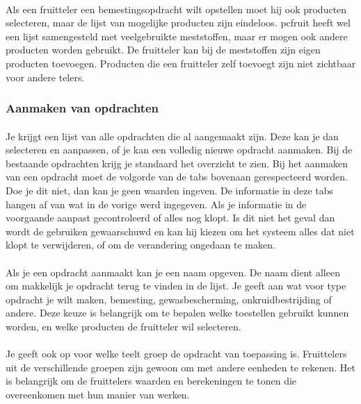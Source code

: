 \paragraph {} Als een fruitteler een bemestingsopdracht wilt opstellen moet hij ook
producten selecteren, maar de lijst van mogelijke producten zijn eindeloos. pcfruit heeft
wel een lijst samengesteld met veelgebruikte meststoffen, maar er mogen ook andere
producten worden gebruikt. De fruitteler kan bij de meststoffen zijn eigen producten
toevoegen. Producten die een fruitteler zelf toevoegt zijn niet zichtbaar voor andere telers.


\subsubsection {Aanmaken van opdrachten}\label{aanmaken_opdrachten}

\paragraph {} Je krijgt een lijst van alle opdrachten die al aangemaakt zijn. Deze kan je
dan selecteren en aanpassen, of je kan een volledig nieuwe opdracht aanmaken. Bij de
bestaande opdrachten krijg je standaard het overzicht te zien. Bij het aanmaken van een
opdracht moet de volgorde van de tabs bovenaan gerespecteerd worden. Doe je dit niet, dan
kan je geen waarden ingeven. De informatie in deze tabs hangen af van wat in de vorige
werd ingegeven. Als je informatie in de voorgaande aanpast gecontroleerd of alles nog
klopt. Is dit niet het geval dan wordt de gebruiken gewaarschuwd en kan hij kiezen om het
systeem alles dat niet klopt te verwijderen, of om de verandering ongedaan te maken.

\paragraph {} Als je een opdracht aanmaakt kan je een naam opgeven. De naam dient alleen
om makkelijk je opdracht terug te vinden in de lijst. Je geeft aan wat voor type opdracht
je wilt maken, bemesting, gewasbescherming, onkruidbestrijding of andere. Deze keuze is
belangrijk om te bepalen welke toestellen gebruikt kunnen worden, en welke producten de
fruitteler wil selecteren.

\paragraph {} Je geeft ook op voor welke teelt groep de opdracht van toepassing is.
Fruittelers uit de verschillende groepen zijn gewoon om met andere eenheden te rekenen.
Het is belangrijk om de fruittelers waarden en berekeningen te tonen die overeenkomen met hun
manier van werken.

